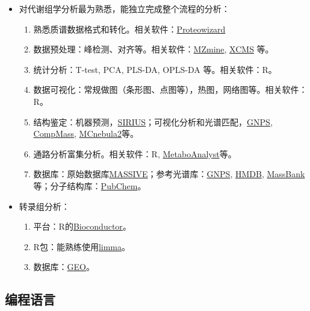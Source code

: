 \documentclass[
]{article}
\providecommand{\tightlist}{%
  \setlength{\itemsep}{0pt}\setlength{\parskip}{0pt}}
\begin{document}
\begin{itemize}
\tightlist
\item
  对代谢组学分析最为熟悉，能独立完成整个流程的分析：

  \begin{enumerate}
  \def\labelenumi{\arabic{enumi}.}
  \tightlist
  \item
    熟悉质谱数据格式和转化。相关软件：\href{http://www.proteowizard.org/}{Proteowizard}
  \item
    数据预处理：峰检测、对齐等。相关软件：\href{http://mzmine.github.io/}{MZmine}, \href{https://bioconductor.org/packages/release/bioc/html/xcms.html}{XCMS} 等。
  \item
    统计分析：T-test, PCA, PLS-DA, OPLS-DA 等。相关软件：R。
  \item
    数据可视化：常规做图（条形图、点图等），热图，网络图等。相关软件：R。
  \item
    结构鉴定：机器预测，\href{https://bio.informatik.uni-jena.de/software/sirius/}{SIRIUS}；可视化分析和光谱匹配，\href{https://gnps.ucsd.edu/ProteoSAFe/static/gnps-splash.jsp}{GNPS}, \href{http://prime.psc.riken.jp/compms/msdial/main.html}{CompMass}, \href{https://bio.informatik.uni-jena.de/software/sirius/}{MCnebula2}等。
  \item
    通路分析富集分析。相关软件：R, \href{https://www.metaboanalyst.ca/}{MetaboAnalyst}等。
  \item
    数据库：原始数据库\href{https://massive.ucsd.edu/ProteoSAFe/static/massive.jsp}{MASSIVE}；参考光谱库：\href{https://ccms-ucsd.github.io/GNPSDocumentation/gnpslibraries/}{GNPS}, \href{https://hmdb.ca/}{HMDB}, \href{http://www.massbank.jp/}{MassBank}等；分子结构库：\href{https://pubchem.ncbi.nlm.nih.gov/}{PubChem}。
  \end{enumerate}
\item
  转录组分析：

  \begin{enumerate}
  \def\labelenumi{\arabic{enumi}.}
  \tightlist
  \item
    平台：R的\href{https://bioconductor.org/}{Bioconductor}。
  \item
    R包：能熟练使用\href{https://bioconductor.org/packages/release/bioc/html/limma.html}{limma}。
  \item
    数据库：\href{https://www.ncbi.nlm.nih.gov/geo/}{GEO}。
  \end{enumerate}
\end{itemize}

\hypertarget{prog}{%
\subsection{编程语言}\label{prog}}
\end{document}

